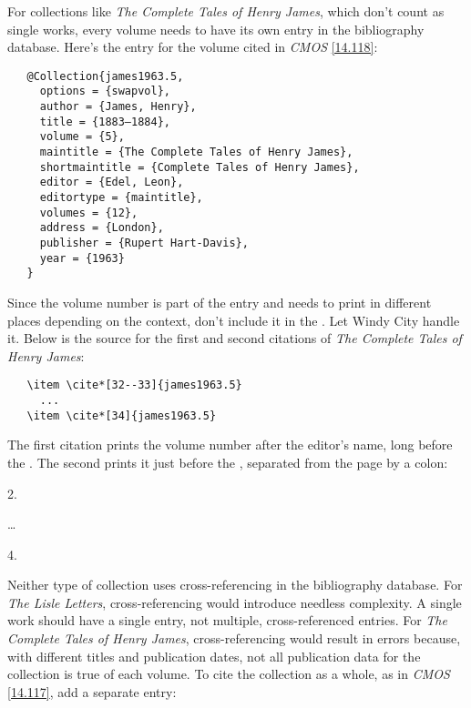 \documentclass[11pt,letterpaper,oneside]{article}
\begin{document}
\begin{citenobib}
\item \cite{byrne1981}
\item \cite{byrne1981}
\end{citenobib}

For collections like \textit{The Complete Tales of Henry James}, which
don't count as single works, every volume needs to have its own entry
in the bibliography database. Here's the entry for the volume cited in
\textit{CMOS} \ref{14.118}:

\begin{verbatim}
   @Collection{james1963.5,
     options = {swapvol},
     author = {James, Henry},
     title = {1883–1884},
     volume = {5},
     maintitle = {The Complete Tales of Henry James},
     shortmaintitle = {Complete Tales of Henry James},
     editor = {Edel, Leon},
     editortype = {maintitle},
     volumes = {12},
     address = {London},
     publisher = {Rupert Hart-Davis},
     year = {1963}
   }
\end{verbatim}

Since the volume number is part of the entry and needs to print in
different places depending on the context, don't include it in the
. Let Windy City handle it. Below is the source for
the first and second citations of \textit{The Complete Tales of Henry
James}:

\begin{verbatim}
   \item \cite*[32--33]{james1963.5}
     ...
   \item \cite*[34]{james1963.5}
\end{verbatim}

\noindent The first citation prints the volume number after the
editor's name, long before the . The second prints
it just before the , separated from the page by a
colon:

\begin{citenobib}
\item[2.] \cite*[32--33]{james1963.5}
\item[\ldots]
\item[4.] \cite*[34]{james1963.5}
\end{citenobib}

Neither type of collection uses cross-referencing in the bibliography
database. For \textit{The Lisle Letters}, cross-referencing would
introduce needless complexity. A single work should have a single
entry, not multiple, cross-referenced entries. For \textit{The
Complete Tales of Henry James}, cross-referencing would result in
errors because, with different titles and publication dates, not all
publication data for the collection is true of each volume. To cite
the collection as a whole, as in \textit{CMOS} \ref{14.117}, add a
separate entry:
\end{document}
